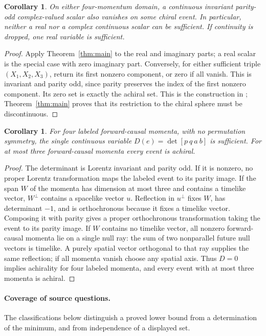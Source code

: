 \documentclass[11pt,a4paper]{article}
\newtheorem{corollary}[theorem]{Corollary}
\begin{document}
\begin{corollary}\label{cor:scalar}
On either four-momentum domain, a continuous invariant parity-odd
complex-valued scalar also vanishes on some chiral event. In particular,
neither a real nor a complex continuous scalar can be sufficient.
If continuity is dropped, one real variable is sufficient.
\end{corollary}
\begin{proof}
Apply Theorem~\ref{thm:main} to the real and imaginary parts; a real
scalar is the special case with zero imaginary part. Conversely, for
either sufficient triple $(X_1,X_2,X_3)$, return its first nonzero
component, or zero if all vanish. This is invariant and parity odd,
since parity preserves the index of the first nonzero component.
Its zero set is exactly the achiral set. This is the construction in
\cite[\S6.1.1, (226)]{LHG}; Theorem~\ref{thm:main} proves that its
restriction to the chiral sphere must be discontinuous.
\end{proof}

\begin{corollary}\label{cor:labelled}
For four labeled forward-causal momenta, with no permutation symmetry,
the single continuous variable $D(e)=\det[p\ q\ a\ b]$ is sufficient.
For at most three forward-causal momenta every event is achiral.
\end{corollary}
\begin{proof}
The determinant is Lorentz invariant and parity odd. If it is nonzero,
no proper Lorentz transformation maps the labeled event to its parity
image. If the span $W$ of the momenta has dimension at most three and
contains a timelike vector, $W^\perp$ contains a spacelike vector $u$.
Reflection in $u^\perp$ fixes $W$, has determinant $-1$, and is
orthochronous because it fixes a timelike vector. Composing it with
parity gives a proper orthochronous transformation taking the event to
its parity image. If $W$ contains no timelike vector, all nonzero
forward-causal momenta lie on a single null ray: the sum of two
nonparallel future null vectors is timelike. A purely spatial vector
orthogonal to that ray supplies the same reflection; if all momenta
vanish choose any spatial axis. Thus $D=0$ implies achirality for four
labeled momenta, and every event with at most three momenta is achiral.
\end{proof}

\clearpage
\paragraph{Coverage of source questions.}
The classifications below distinguish a proved lower bound from a
determination of the minimum, and from independence of a displayed set.
\smallskip
\end{document}
